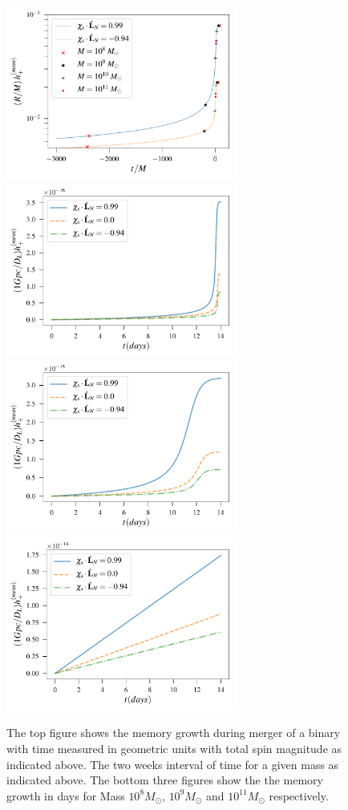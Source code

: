 \documentclass[twocolumn,showpacs,aps,prd,nobibnotes,floatfix]{revtex4-1}
\begin{document}
\begin{figure}
	\includegraphics[width=3.0in]{../plots/PlotfromMathematicaData/MemoryGrowth2weeksGeoUnits.pdf}
	\includegraphics[width=3.0in]{../plots/PlotfromMathematicaData/MemoryGrowth2weeksInDays10pow8MSun.pdf}
	\includegraphics[width=3.0in]{../plots/PlotfromMathematicaData/MemoryGrowth2weeksInDays10pow9MSun.pdf}
	\includegraphics[width=3.0in]{../plots/PlotfromMathematicaData/MemoryGrowth2weeksInDays10pow11MSun.pdf}
	\caption{The top figure shows the memory growth during merger of a binary with time measured in geometric units with total spin magnitude as indicated above. The two weeks interval of time for a given mass as indicated above. The bottom three figures show the the memory growth in days for Mass $10^{8}M_{\odot}$, $10^{9}M_{\odot}$ and $10^{11}M_{\odot}$ respectively.}
	\label{fig:MemoryGrowthTwoweeks}
\end{figure} 
\end{document}
